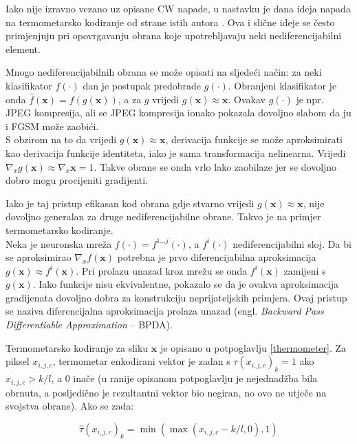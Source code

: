 \documentclass[utf8, diplomski]{fer}
\begin{document}
Iako nije izravno vezano uz opisane CW napade, u nastavku je dana ideja napada na termometarsko kodiranje od strane istih autora \citep{obfuscated}. Ova i slične ideje se često primjenjuju pri opovrgavanju obrana koje upotrebljavaju neki nediferencijabilni element. \par
Mnogo nediferencijabilnih obrana se može opisati na sljedeći način: za neki klasifikator $f(\cdot)$ dan je postupak predobrade $g(\cdot)$. Obranjeni klasifikator je onda $\hat{f}(\boldsymbol{x}) = f(g(\boldsymbol{x}))$, a za $g$ vrijedi $g(\boldsymbol{x}) \approx \boldsymbol{x}$. Ovakav $g(\cdot)$ je npr. JPEG kompresija, ali se JPEG kompresija ionako pokazala dovoljno slabom da ju i FGSM može zaobići. \\
S obzirom na to da vrijedi $g(\boldsymbol{x}) \approx \boldsymbol{x}$, derivacija funkcije se može aproksimirati kao derivacija funkcije identiteta, iako je sama transformacija nelinearna. Vrijedi $\nabla_{x}g(\boldsymbol{x}) \approx \nabla_{x} \boldsymbol{x} = 1$. Takve obrane se onda vrlo lako zaobilaze jer se dovoljno dobro mogu procijeniti gradijenti.
\par
Iako je taj pristup efikasan kod obrana gdje stvarno vrijedi $g(\boldsymbol{x}) \approx \boldsymbol{x}$, nije dovoljno generalan za druge nediferencijabilne obrane. Takvo je na primjer termometarsko kodiranje. \\
Neka je neuronska mreža $f(\cdot) = f^{1...j}(\cdot)$, a $f^{i}(\cdot)$ nediferencijabilni sloj. Da bi se aproksimirao $\nabla_{x}f(\boldsymbol{x})$ potrebna je prvo diferencijabilna aproksimacija $g(\boldsymbol{x}) \approx f^{i}(\boldsymbol{x})$. Pri prolazu unazad kroz mrežu se onda $f^{i}(\boldsymbol{x})$ zamijeni s $g(\boldsymbol{x})$. Iako funkcije nisu ekvivalentne, pokazalo se da je ovakva aproksimacija gradijenata dovoljno dobra za konstrukciju neprijateljskih primjera. Ovaj pristup se naziva diferencijalna aproksimacija prolaza unazad (engl. \textit{Backward Pass Differentiable Approximation} -- BPDA).
\par
Termometarsko kodiranje za sliku $\boldsymbol{x}$ je opisano u potpoglavlju \ref{thermometer}. Za piksel $x_{i,j,c}$, termometar enkodirani vektor je zadan s $\tau(x_{i, j, c})_{k} = 1$ ako $x_{i,j,c} > k/l$, a $0$ inače (u ranije opisanom potpoglavlju je nejednadžba bila obrnuta, a posljedično je rezultantni vektor bio negiran, no ovo ne utječe na svojstva obrane). Ako se zada:

\begin{equation}
	\hat{\tau} (x_{i, j, c})_{k} = \min(\max(x_{i,j,c} - k/l, 0), 1)
\end{equation}
\end{document}
